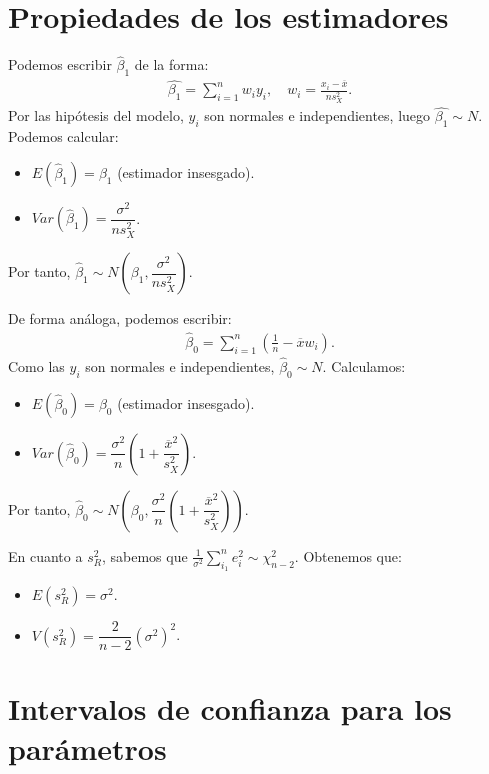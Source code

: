 \section{Propiedades de los estimadores}

Podemos escribir $\widehat{\beta}_1$ de la forma:
\begin{align*}
    \hat{\beta_1} = \sum_{i=1}^n w_iy_i, \quad w_i = \frac{x_i - \overline{x}}{ns_X^2}.
\end{align*}
Por las hipótesis del modelo, $y_i$ son normales e independientes, luego $\hat{\beta_1} \sim N$.
Podemos calcular:

\begin{itemize}
    \item $E(\widehat{\beta}_1) = \beta_1$ (estimador insesgado).
    \item $Var(\widehat{\beta}_1) = \dfrac{\sigma^2}{ns_X^2}$.
\end{itemize}
Por tanto, $\widehat{\beta}_1 \sim N\left(\beta_1, \dfrac{\sigma^2}{ns_X^2}\right)$.

De forma análoga, podemos escribir:
\begin{align*}
    \widehat{\beta}_0 = \sum_{i=1}^n \left(\frac{1}{n} - \overline{x}w_i\right).
\end{align*}
Como las $y_i$ son normales e independientes, $\widehat{\beta}_0 \sim N$.
Calculamos:

\begin{itemize}
    \item $E(\widehat{\beta}_0) = \beta_0$ (estimador insesgado).
    \item $Var(\widehat{\beta}_0) = \dfrac{\sigma^2}{n} \left(1 + \dfrac{\overline{x}^2}{s_X^2}\right)$.
\end{itemize}
Por tanto, $\widehat{\beta}_0 \sim N\left(\beta_0, \dfrac{\sigma^2}{n} \left(1 + \dfrac{\overline{x}^2}{s_X^2}\right)\right)$.

En cuanto a $s_R^2$, sabemos que $\frac{1}{\sigma^2} \sum_{i_1}^n e_i^2 \sim \chi^2_{n-2}$.
Obtenemos que:
\begin{itemize}
    \item $E(s_R^2) = \sigma^2$.
    \item $V(s_R^2) = \dfrac{2}{n-2} (\sigma^2)^2$.
\end{itemize}

\section{Intervalos de confianza para los parámetros}

